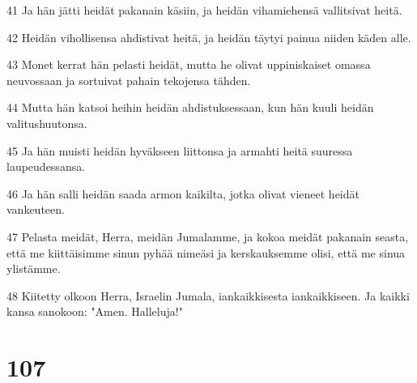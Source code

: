 \par 41 Ja hän jätti heidät pakanain käsiin, ja heidän vihamiehensä vallitsivat heitä.
\par 42 Heidän vihollisensa ahdistivat heitä, ja heidän täytyi painua niiden käden alle.
\par 43 Monet kerrat hän pelasti heidät, mutta he olivat uppiniskaiset omassa neuvossaan ja sortuivat pahain tekojensa tähden.
\par 44 Mutta hän katsoi heihin heidän ahdistuksessaan, kun hän kuuli heidän valitushuutonsa.
\par 45 Ja hän muisti heidän hyväkseen liittonsa ja armahti heitä suuressa laupeudessansa.
\par 46 Ja hän salli heidän saada armon kaikilta, jotka olivat vieneet heidät vankeuteen.
\par 47 Pelasta meidät, Herra, meidän Jumalamme, ja kokoa meidät pakanain seasta, että me kiittäisimme sinun pyhää nimeäsi ja kerskauksemme olisi, että me sinua ylistämme.
\par 48 Kiitetty olkoon Herra, Israelin Jumala, iankaikkisesta iankaikkiseen. Ja kaikki kansa sanokoon: "Amen. Halleluja!"

\chapter{107}

